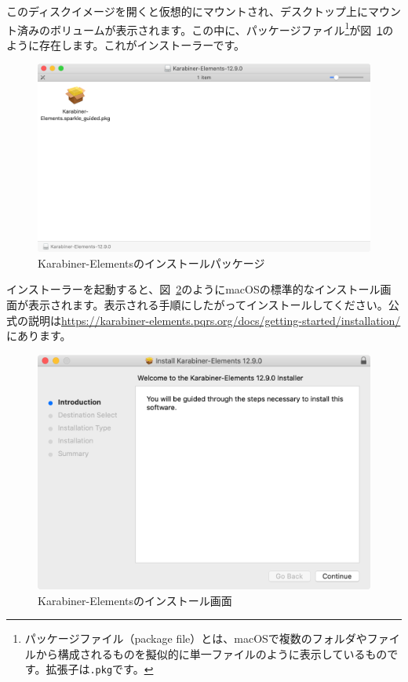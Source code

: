 このディスクイメージを開くと仮想的にマウントされ、デスクトップ上にマウント済みのボリュームが表示されます。この中に、パッケージファイル\footnote{パッケージファイル（package file）とは、macOSで複数のフォルダやファイルから構成されるものを擬似的に単一ファイルのように表示しているものです。拡張子は\texttt{.pkg}です。}が図~\ref{fig:Karabiner_pkg}のように存在します。これがインストーラーです。

\begin{figure}
  \centering
  \includegraphics[scale=0.35]{fig/Karabiner_pkg.png}
  \caption{Karabiner-Elementsのインストールパッケージ}
  \label{fig:Karabiner_pkg}
\end{figure}

インストーラーを起動すると、図~\ref{fig:Karabiner_install}のようにmacOSの標準的なインストール画面が表示されます。表示される手順にしたがってインストールしてください。公式の説明は\url{https://karabiner-elements.pqrs.org/docs/getting-started/installation/}にあります。

\begin{figure}
  \centering
  \includegraphics[scale=0.35]{fig/Karabiner_install.png}
  \caption{Karabiner-Elementsのインストール画面}
  \label{fig:Karabiner_install}
\end{figure}

